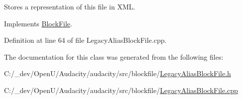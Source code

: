 Stores a representation of this file in X\+ML. 



Implements \hyperlink{class_block_file_a62527189fe371325e23f3802f20282f8}{Block\+File}.



Definition at line 64 of file Legacy\+Alias\+Block\+File.\+cpp.



The documentation for this class was generated from the following files\+:\begin{DoxyCompactItemize}
\item 
C\+:/\+\_\+dev/\+Open\+U/\+Audacity/audacity/src/blockfile/\hyperlink{_legacy_alias_block_file_8h}{Legacy\+Alias\+Block\+File.\+h}\item 
C\+:/\+\_\+dev/\+Open\+U/\+Audacity/audacity/src/blockfile/\hyperlink{_legacy_alias_block_file_8cpp}{Legacy\+Alias\+Block\+File.\+cpp}\end{DoxyCompactItemize}
